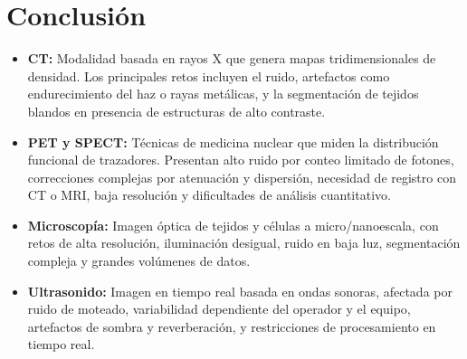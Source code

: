 \section{Conclusión}
\begin{itemize}
\item \textbf{CT:} Modalidad basada en rayos X que genera mapas tridimensionales de densidad. Los principales retos incluyen el ruido, artefactos como endurecimiento del haz o rayas metálicas, y la segmentación de tejidos blandos en presencia de estructuras de alto contraste.

\item \textbf{PET y SPECT:} Técnicas de medicina nuclear que miden la distribución funcional de trazadores. Presentan alto ruido por conteo limitado de fotones, correcciones complejas por atenuación y dispersión, necesidad de registro con CT o MRI, baja resolución y dificultades de análisis cuantitativo.

\item \textbf{Microscopía:} Imagen óptica de tejidos y células a micro/nanoescala, con retos de alta resolución, iluminación desigual, ruido en baja luz, segmentación compleja y grandes volúmenes de datos.

\item \textbf{Ultrasonido:} Imagen en tiempo real basada en ondas sonoras, afectada por ruido de moteado, variabilidad dependiente del operador y el equipo, artefactos de sombra y reverberación, y restricciones de procesamiento en tiempo real.

\end{itemize}
